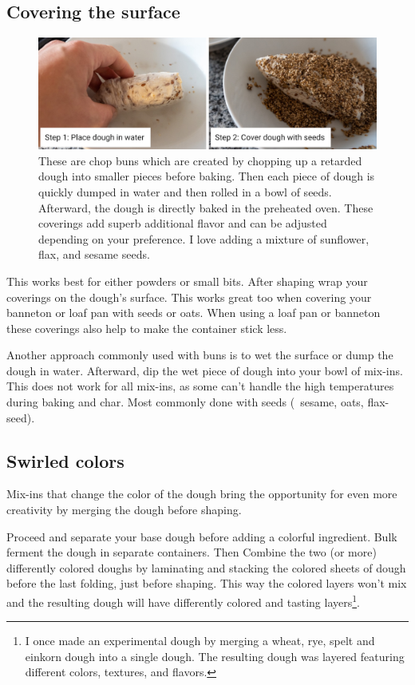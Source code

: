 \subsection{Covering the surface}

\begin{figure}[htb!]
  \centering
  \includegraphics[width=\textwidth]{surface-seeds}
  \caption[Surface seeds]{These are chop buns which are created by chopping
    up a retarded dough into smaller pieces before baking. Then each piece of
    dough is quickly dumped in water and then rolled in a bowl of seeds.
    Afterward, the dough is directly baked in the preheated oven. These
    coverings add superb additional flavor and can be adjusted depending on
    your preference. I love adding a mixture of sunflower, flax, and
    sesame seeds.}%
  \label{fig:surface-seeds}
\end{figure}

This works best for either powders or small bits. After shaping wrap your
coverings on the dough's surface. This works great too when covering your
banneton or loaf pan with seeds or oats. When using a loaf pan or banneton
these coverings also help to make the container stick less.

Another approach commonly used with buns is to wet the surface or dump the
dough in water. Afterward, dip the wet piece of dough into your bowl of
mix-ins.  This does not work for all mix-ins, as some can't handle the high
temperatures during baking and char. Most commonly done with seeds
(\eg~sesame, oats, flax-seed).

\subsection{Swirled colors}
Mix-ins that change the color of the dough bring the opportunity for even more
creativity by merging the dough before shaping.

Proceed and separate your base dough before adding a colorful ingredient. Bulk
ferment the dough in separate containers. Then Combine the two (or
more) differently colored doughs by laminating and stacking the colored sheets
of dough before the last folding, just before shaping. This way the colored
layers won't mix and the resulting dough will have differently colored and
tasting layers\footnote{I once made an experimental dough by merging a wheat,
rye, spelt and einkorn dough into a single dough. The resulting dough was
layered featuring different colors, textures, and flavors.}.
